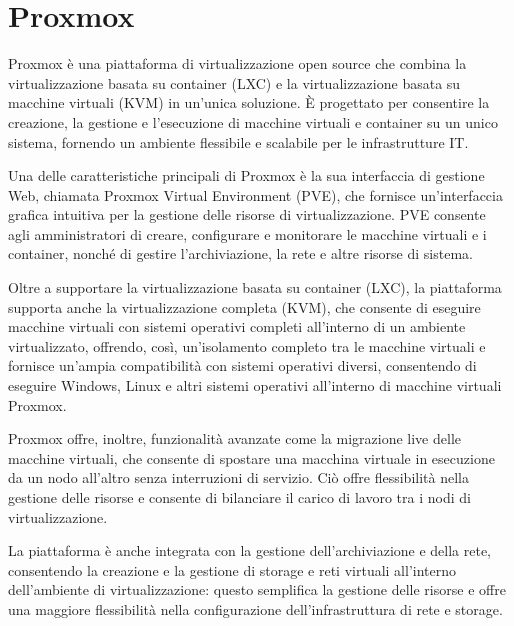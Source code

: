 \section{Proxmox}

Proxmox è una piattaforma di virtualizzazione open source che combina la virtualizzazione basata su container (LXC) e la virtualizzazione basata su macchine virtuali (KVM) in un'unica soluzione. È progettato per consentire la creazione, la gestione e l'esecuzione di macchine virtuali e container su un unico sistema, fornendo un ambiente flessibile e scalabile per le infrastrutture IT.

Una delle caratteristiche principali di Proxmox è la sua interfaccia di gestione Web, chiamata Proxmox Virtual Environment (PVE), che fornisce un'interfaccia grafica intuitiva per la gestione delle risorse di virtualizzazione. PVE consente agli amministratori di creare, configurare e monitorare le macchine virtuali e i container, nonché di gestire l'archiviazione, la rete e altre risorse di sistema.

Oltre a supportare la virtualizzazione basata su container (LXC), la piattaforma supporta anche la virtualizzazione completa (KVM), che consente di eseguire macchine virtuali con sistemi operativi completi all'interno di un ambiente virtualizzato, offrendo, così, un'isolamento completo tra le macchine virtuali e fornisce un'ampia compatibilità con sistemi operativi diversi, consentendo di eseguire Windows, Linux e altri sistemi operativi all'interno di macchine virtuali Proxmox.

Proxmox offre, inoltre, funzionalità avanzate come la migrazione live delle macchine virtuali, che consente di spostare una macchina virtuale in esecuzione da un nodo all'altro senza interruzioni di servizio. Ciò offre flessibilità nella gestione delle risorse e consente di bilanciare il carico di lavoro tra i nodi di virtualizzazione.

La piattaforma è anche integrata con la gestione dell'archiviazione e della rete, consentendo la creazione e la gestione di storage e reti virtuali all'interno dell'ambiente di virtualizzazione: questo semplifica la gestione delle risorse e offre una maggiore flessibilità nella configurazione dell'infrastruttura di rete e storage.

